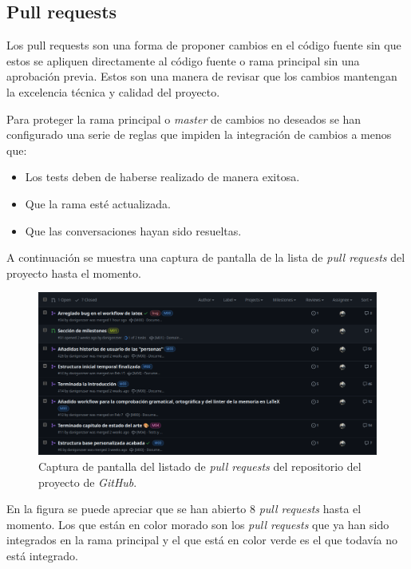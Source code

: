 \subsection{Pull requests}

Los pull requests son una forma de proponer cambios en el código fuente sin que estos se apliquen directamente al código fuente o rama principal sin una aprobación previa. Estos son una manera de revisar que los cambios mantengan la excelencia técnica y calidad del proyecto.

Para proteger la rama principal o \textit{master} de cambios no deseados se han configurado una serie de reglas que impiden la integración de cambios a menos que:

\begin{itemize}
    \item Los tests deben de haberse realizado de manera exitosa.
    \item Que la rama esté actualizada.
    \item Que las conversaciones hayan sido resueltas.
\end{itemize}

A continuación se muestra una captura de pantalla de la lista de \textit{pull requests} del proyecto hasta el momento.

\begin{figure}[H]
    \caption{Captura de pantalla del listado de \textit{pull requests} del repositorio del proyecto de \textit{GitHub}.}
    \centering
    \vspace*{0.5cm}
    \includegraphics[scale=0.2]{figuras/listado_pull_requests_github.png}
\end{figure}

En la figura se puede apreciar que se han abierto 8 \textit{pull requests} hasta el momento. Los que están en color morado son los \textit{pull requests} que ya han sido integrados en la rama principal y el que está en color verde es el que todavía no está integrado.

